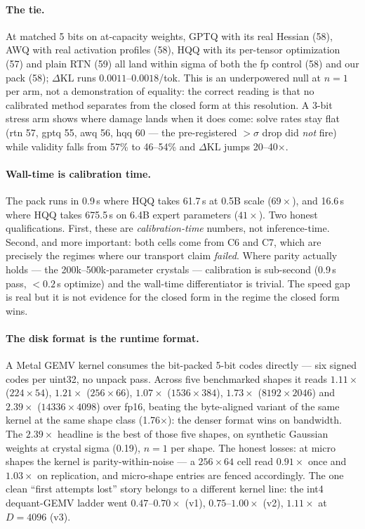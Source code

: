 \documentclass[11pt]{article}
\newcommand{\dkl}{\ensuremath{\Delta\mathrm{KL}}}
\begin{document}
\paragraph{The tie.}
At matched 5 bits on at-capacity weights, GPTQ with its real Hessian (58), AWQ
with real activation profiles (58), HQQ with its per-tensor optimization (57)
and plain RTN (59) all land within sigma of both the fp control (58) and our
pack (58); \dkl{} runs $0.0011$--$0.0018$/tok. %
This is an underpowered null at $n{=}1$ per arm, not a demonstration of
equality: the correct reading is that no calibrated method separates from the
closed form at this resolution. A 3-bit stress arm shows where damage lands when
it does come: solve rates stay flat (rtn 57, gptq 55, awq 56, hqq 60 --- the
pre-registered $>\!\sigma$ drop did \emph{not} fire) while validity falls from
57\% to 46--54\% and \dkl{} jumps 20--40$\times$. %

\paragraph{Wall-time is calibration time.}
The pack runs in 0.9\,s where HQQ takes 61.7\,s at 0.5B scale ($69\times$), and
16.6\,s where HQQ takes 675.5\,s on 6.4B expert parameters ($41\times$).
Two honest qualifications. First, these are \emph{calibration-time} numbers, not
inference-time. Second, and more important: both cells come from C6 and C7,
which are precisely the regimes where our transport claim \emph{failed}. Where
parity actually holds --- the 200k--500k-parameter crystals --- calibration is
sub-second (0.9\,s pass, $<\!0.2$\,s optimize) and the wall-time differentiator
is trivial. %
The speed gap is real but it is not evidence for the closed form in the regime
the closed form wins.

\paragraph{The disk format is the runtime format.}
A Metal GEMV kernel consumes the bit-packed 5-bit codes directly --- six signed
codes per uint32, no unpack pass. Across five benchmarked shapes it reads
$1.11\times$ ($224{\times}54$), $1.21\times$ ($256{\times}66$), $1.07\times$
($1536{\times}384$), $1.73\times$ ($8192{\times}2046$) and $2.39\times$
($14336{\times}4098$) over fp16, beating the byte-aligned variant of the same
kernel at the same shape class (1.76$\times$): the denser format wins on
bandwidth. %
The $2.39\times$ headline is the best of those five shapes, on synthetic
Gaussian weights at crystal sigma (0.19), $n{=}1$ per shape.
The honest losses: at micro shapes the kernel is parity-within-noise --- a
$256{\times}64$ cell read $0.91\times$ once and $1.03\times$ on replication, and
micro-shape entries are fenced accordingly. %
The one clean ``first attempts lost'' story belongs to a different kernel line:
the int4 dequant-GEMV ladder went $0.47$--$0.70\times$ (v1), $0.75$--$1.00\times$
(v2), $1.11\times$ at $D{=}4096$ (v3). %
\end{document}
